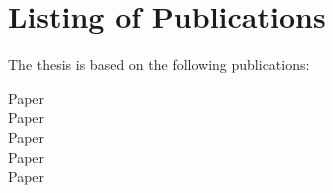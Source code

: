 \chapter*{Listing of Publications}
The thesis is based on the following publications:
\begin{description} 
    \item[Paper ] 
    \item[Paper ] 
    \item[Paper  ] 
    \item[Paper  ] 
    \item[Paper ] 
\end{description}
